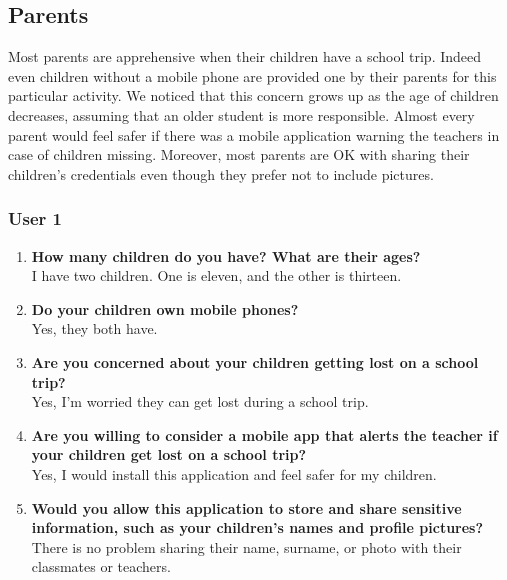 \subsection{Parents}
Most parents are apprehensive when their children have a school trip. Indeed even children without a mobile phone are provided one by their parents for this particular activity. We noticed that this concern grows up as the age of children decreases, assuming that an older student is more responsible. Almost every parent would feel safer if there was a mobile application warning the teachers in case of children missing. Moreover, most parents are OK with sharing their children's credentials even though they prefer not to include pictures.
\subsubsection*{User 1}
\begin{enumerate}
\item \textbf{How many children do you have? What are their ages?}
\\ I have two children. One is eleven, and the other is thirteen.
\item \textbf{Do your children own mobile phones?}
\\ Yes, they both have.
\item \textbf{Are you concerned about your children getting lost on a school trip?}
\\ Yes, I'm worried they can get lost during a school trip.
\item \textbf{Are you willing to consider a mobile app that alerts the teacher if your children get lost on a school trip?}
\\ Yes, I would install this application and feel safer for my children.
\item \textbf{Would you allow this application to store and share sensitive information, such as your children's names and profile pictures?}
\\ There is no problem sharing their name, surname, or photo with their classmates or teachers. 
\end{enumerate}

